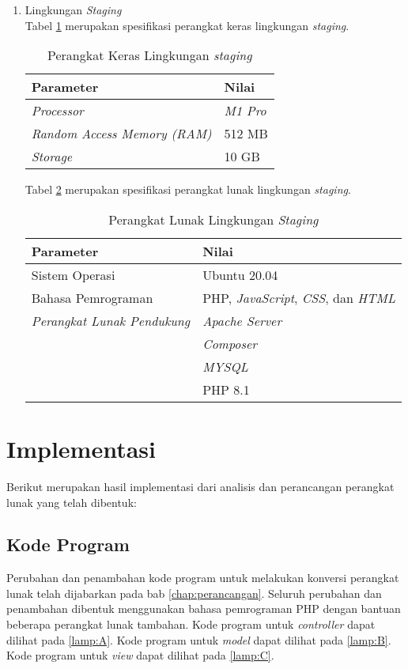 \begin{enumerate}
	\item Lingkungan \textit{Staging}\\
	Tabel \ref{tab:staginghard} merupakan spesifikasi perangkat keras lingkungan \textit{staging}.
	\begin{table}[H]
 	\caption{Perangkat Keras Lingkungan \textit{staging}}
	\label{tab:staginghard}
    \centering
    	\begin{tabular}{|l|l|}
    	\hline
        	\textbf{Parameter} & \textbf{Nilai} \\ \hline
        	\textit{Processor} & \textit{M1 Pro} \\ \hline
        	\textit{Random Access Memory (RAM)} & 512 MB \\ \hline
        	\textit{Storage} & 10 GB \\ \hline
    	\end{tabular}
	\end{table}
	Tabel \ref{tab:stagingsoft} merupakan spesifikasi perangkat lunak lingkungan \textit{staging}.
 	\begin{table}[H]
 	\caption{Perangkat Lunak Lingkungan \textit{Staging}}
	\label{tab:stagingsoft}
    \centering
    	\begin{tabular}{|l|l|}
    	\hline
        	\textbf{Parameter} & \textbf{Nilai} \\ \hline
        	Sistem Operasi & Ubuntu 20.04 \\ \hline
        	Bahasa Pemrograman & PHP, \textit{JavaScript}, \textit{CSS}, dan \textit{HTML} \\ \hline
        	\textit{Perangkat Lunak Pendukung} & \textit{Apache Server}\\ & \textit{Composer}\\ & \textit{MYSQL} \\ & PHP 8.1\\ \hline
    	\end{tabular}
	\end{table}
\end{enumerate}

\section{Implementasi}
Berikut merupakan hasil implementasi dari analisis dan perancangan perangkat lunak yang telah dibentuk:
\subsection{Kode Program}
Perubahan dan penambahan kode program untuk melakukan konversi perangkat lunak telah dijabarkan pada bab \ref{chap:perancangan}. Seluruh perubahan dan penambahan dibentuk menggunakan bahasa pemrograman PHP dengan bantuan beberapa perangkat lunak tambahan. Kode program untuk \textit{controller} dapat dilihat pada \ref{lamp:A}. Kode program untuk \textit{model} dapat dilihat pada \ref{lamp:B}. Kode program untuk \textit{view} dapat dilihat pada \ref{lamp:C}.


